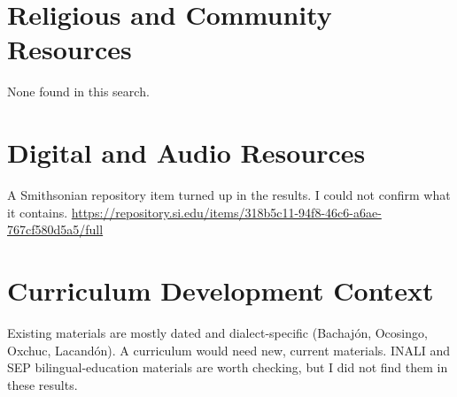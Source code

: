 \documentclass[12pt]{article}
\begin{document}
\section{Religious and Community Resources}
None found in this search.
\section{Digital and Audio Resources}
A Smithsonian repository item turned up in the results. I could not confirm what it contains. \url{https://repository.si.edu/items/318b5c11-94f8-46c6-a6ae-767cf580d5a5/full}
\section{Curriculum Development Context}
Existing materials are mostly dated and dialect-specific (Bachaj\'on, Ocosingo, Oxchuc, Lacand\'on). A curriculum would need new, current materials. INALI and SEP bilingual-education materials are worth checking, but I did not find them in these results.
\end{document}
